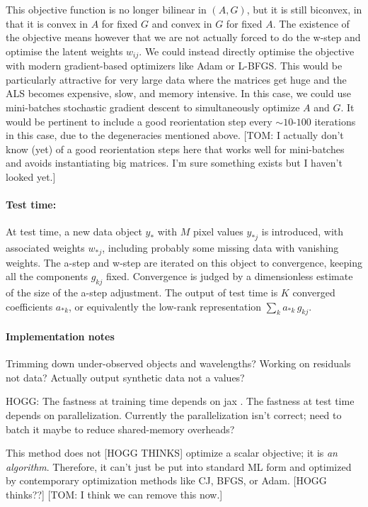 \documentclass{article}
\begin{document}
This objective function is no longer bilinear in $(A,G)$, but it is still biconvex, in that it is convex in $A$ for fixed $G$ and convex in $G$ for fixed $A$.
The existence of the objective means however that we are not actually forced to do the w-step and optimise the latent weights $w_{ij}$.
We could instead directly optimise the objective with modern gradient-based optimizers like Adam or L-BFGS.
This would be particularly attractive for very large data where the matrices get huge and the ALS becomes expensive, slow, and memory intensive.
In this case, we could use mini-batches stochastic gradient descent to simultaneously optimize $A$ and $G$.
It would be pertinent to include a good reorientation step every $\sim10$-$100$ iterations in this case, due to the degeneracies mentioned above.
[TOM: I actually don't know (yet) of a good reorientation steps here that works well for mini-batches and avoids instantiating big matrices. I'm sure something exists but I haven't looked yet.]


\paragraph{Test time:}
At test time, a new data object $y_\ast$ with $M$ pixel values $y_{\ast j}$ is introduced, with associated weights $w_{\ast j}$, including probably some missing data with vanishing weights.
The a-step and w-step are iterated on this object to convergence, keeping all the components $g_{kj}$ fixed.
Convergence is judged by a dimensionless estimate of the size of the a-step adjustment.
The output of test time is $K$ converged coefficients $a_{\ast k}$, or equivalently the low-rank representation $\sum_k a_{\ast k}\,g_{kj}$.

\paragraph{Implementation notes}
Trimming down under-observed objects and wavelengths?
Working on residuals not data?
Actually output synthetic data not a values?

HOGG: The fastness at training time depends on jax \cite{jax}.
The fastness at test time depends on parallelization.
Currently the parallelization isn't correct; need to batch it maybe to reduce shared-memory overheads?

This method does not [HOGG THINKS] optimize a scalar objective; it is \emph{an algorithm}.
Therefore, it can't just be put into standard ML form and optimized by contemporary optimization methods like CJ, BFGS, or Adam.
[HOGG thinks??]
[TOM: I think we can remove this now.]
\end{document}
